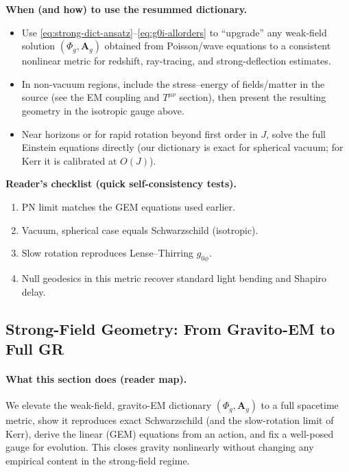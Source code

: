 \medskip
\noindent\textbf{When (and how) to use the resummed dictionary.}
\begin{itemize}
  \item Use \eqref{eq:strong-dict-ansatz}--\eqref{eq:g0i-allorders} to ``upgrade'' any weak-field solution \((\Phi_g,\mathbf A_g)\) obtained from Poisson/wave equations to a consistent nonlinear metric for redshift, ray-tracing, and strong-deflection estimates.
  \item In non-vacuum regions, include the stress--energy of fields/matter in the source (see the EM coupling and \(T^{\mu\nu}\) section), then present the resulting geometry in the isotropic gauge above.
  \item Near horizons or for rapid rotation beyond first order in \(J\), solve the full Einstein equations directly (our dictionary is exact for spherical vacuum; for Kerr it is calibrated at \(O(J)\)).
\end{itemize}

\medskip
\noindent\textbf{Reader’s checklist (quick self-consistency tests).}
\begin{enumerate}
  \item PN limit matches the GEM equations used earlier.
  \item Vacuum, spherical case equals Schwarzschild (isotropic).
  \item Slow rotation reproduces Lense--Thirring \(g_{0\phi}\).
  \item Null geodesics in this metric recover standard light bending and Shapiro delay.
\end{enumerate}


\subsection{Strong-Field Geometry: From Gravito-EM to Full GR}
\label{sec:strong-field-geometry}

\paragraph{What this section does (reader map).}
We elevate the weak-field, gravito-EM dictionary $(\Phi_g,\mathbf A_g)$ to a full spacetime metric, show it reproduces exact Schwarzschild (and the slow-rotation limit of Kerr), derive the linear (GEM) equations from an action, and fix a well-posed gauge for evolution. This closes gravity nonlinearly without changing any empirical content in the strong-field regime.

